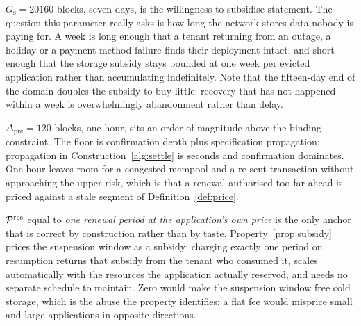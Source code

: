 $G_{\mathrm{s}} = \num{20160}$ blocks, seven days, is the willingness-to-subsidise statement. The
question this parameter really asks is how long the network stores data nobody is paying for. A week
is long enough that a tenant returning from an outage, a holiday or a payment-method failure finds
their deployment intact, and short enough that the storage subsidy stays bounded at one week per
evicted application rather than accumulating indefinitely. Note that the fifteen-day end of the
domain doubles the subsidy to buy little: recovery that has not happened within a week is
overwhelmingly abandonment rather than delay.

$\Delta_{\mathrm{pre}} = \num{120}$ blocks, one hour, sits an order of magnitude above the binding
constraint. The floor is confirmation depth plus specification propagation; propagation in
Construction~\ref{alg:settle} is seconds and confirmation dominates. One hour leaves room for a
congested mempool and a re-sent transaction without approaching the upper risk, which is that a
renewal authorised too far ahead is priced against a stale segment of
Definition~\ref{def:price}.

$\mathcal{P}^{\mathrm{res}}$ equal to \emph{one renewal period at the application's own price} is the
only anchor that is correct by construction rather than by taste. Property~\ref{prop:subsidy} prices
the suspension window as a subsidy; charging exactly one period on resumption returns that subsidy
from the tenant who consumed it, scales automatically with the resources the application actually
reserved, and needs no separate schedule to maintain. Zero would make the suspension window free cold
storage, which is the abuse the property identifies; a flat fee would misprice small and large
applications in opposite directions.

